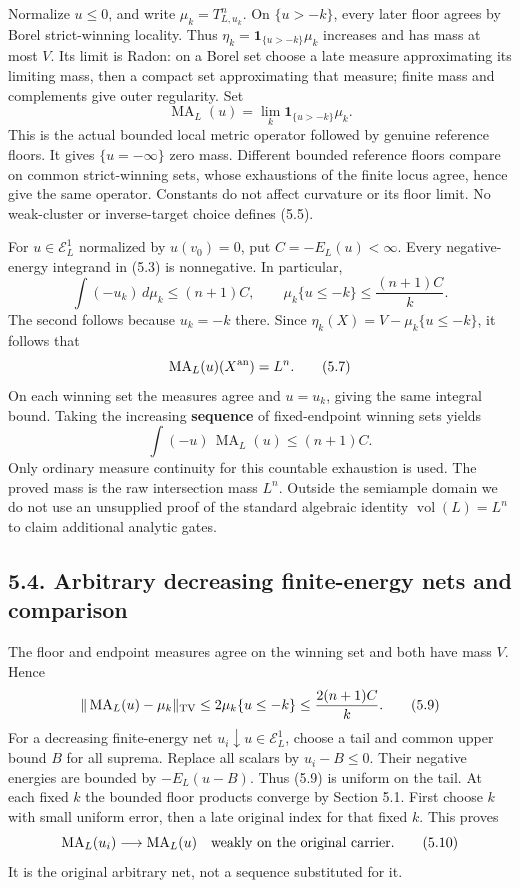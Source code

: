 \documentclass[
  10pt,
]{article}
\begin{document}
Normalize \(u\le0\), and write \(\mu_k=T_{L,u_k}^n\). On \(\{u>-k\}\),
every later floor agrees by Borel strict-winning locality. Thus
\(\eta_k=\mathbf1_{\{u>-k\}}\mu_k\) increases and has mass at most
\(V\). Its limit is Radon: on a Borel set choose a late measure
approximating its limiting mass, then a compact set approximating that
measure; finite mass and complements give outer regularity. Set
\[\operatorname{MA}_L(u)=\lim_k\mathbf1_{\{u>-k\}}\mu_k. \tag{5.5}\]
This is the actual bounded local metric operator followed by genuine
reference floors. It gives \(\{u=-\infty\}\) zero mass. Different
bounded reference floors compare on common strict-winning sets, whose
exhaustions of the finite locus agree, hence give the same operator.
Constants do not affect curvature or its floor limit. No weak-cluster or
inverse-target choice defines (5.5).

For \(u\in\mathcal E^1_L\) normalized by \(u(v_0)=0\), put
\(C=-E_L(u)<\infty\). Every negative-energy integrand in (5.3) is
nonnegative. In particular, \[\int(-u_k)\,d\mu_k\le(n+1)C,\qquad
\mu_k\{u\le-k\}\le\frac{(n+1)C}{k}. \tag{5.6}\] The second follows
because \(u_k=-k\) there. Since \(\eta_k(X)=V-\mu_k\{u\le-k\}\), it
follows that \[\operatorname{MA}_L(u)(X^{\rm an})=L^n. \tag{5.7}\] On
each winning set the measures agree and \(u=u_k\), giving the same
integral bound. Taking the increasing \textbf{sequence} of
fixed-endpoint winning sets yields
\[\int(-u)\,\operatorname{MA}_L(u)\le(n+1)C. \tag{5.8}\] Only ordinary
measure continuity for this countable exhaustion is used. The proved
mass is the raw intersection mass \(L^n\). Outside the semiample domain
we do not use an unsupplied proof of the standard algebraic identity
\(\operatorname{vol}(L)=L^n\) to claim additional analytic gates.

\subsection{5.4. Arbitrary decreasing finite-energy nets and
comparison}\label{arbitrary-decreasing-finite-energy-nets-and-comparison}

The floor and endpoint measures agree on the winning set and both have
mass \(V\). Hence \[\|\operatorname{MA}_L(u)-\mu_k\|_{\rm TV}
\le2\mu_k\{u\le-k\}\le\frac{2(n+1)C}{k}. \tag{5.9}\] For a decreasing
finite-energy net \(u_i\downarrow u\in\mathcal E^1_L\), choose a tail
and common upper bound \(B\) for all suprema. Replace all scalars by
\(u_i-B\le0\). Their negative energies are bounded by \(-E_L(u-B)\).
Thus (5.9) is uniform on the tail. At each fixed \(k\) the bounded floor
products converge by Section 5.1. First choose \(k\) with small uniform
error, then a late original index for that fixed \(k\). This proves
\[\operatorname{MA}_L(u_i)\longrightarrow\operatorname{MA}_L(u)
\quad\hbox{weakly on the original carrier}. \tag{5.10}\] It is the
original arbitrary net, not a sequence substituted for it.
\end{document}
